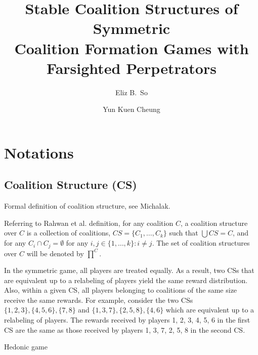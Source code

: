 \documentclass[sigconf,anonymous]{aamas}
\title[Stable Coalition Structures]{Stable Coalition Structures of Symmetric\\
Coalition Formation Games with Farsighted Perpetrators}
\author{Eliz B.~So}
\affiliation{
  \institution{Australian National University}
  \city{Canberra}
  \country{Australia }}
\author{Yun Kuen Cheung}
\affiliation{
  \institution{Australian National University}
  \city{Canberra}
  \country{Australia}}
\newcommand{\ykc}[1]{{\color{blue} #1}}
\begin{document}

\pagestyle{fancy}
\fancyhead{}


\maketitle 





\section{Notations}


\subsection{Coalition Structure (CS)}

\ykc{Formal definition of coalition structure, see Michalak.}

Referring to Rahwan et al. definition, for any coalition $C$, a coalition structure over $C$ is a collection of coalitions, $CS = \{ C_1, \dots, C_k\}$ such that $\bigcup CS = C$, and for any $C_i \cap C_j = \emptyset$ for any $i, j \in \{1, \dots, k\}:i\neq j$. The set of coalition structures over $C$ will be denoted by $\prod^C$.

In the symmetric game, all players are treated equally. As a result, two CSs that are equivalent up to a relabeling of players yield the same reward distribution. Also, within a given CS, all players belonging to coalitions of the same size receive the same rewards. For example, consider the two CSs $\{1, 2, 3\}, \{4, 5, 6\}, \{7, 8\}$ and $\{1, 3, 7\}, \{2, 5, 8\}, \{4, 6\}$ which are equivalent up to a relabeling of players. The rewards received by players 1, 2, 3, 4, 5, 6 in the first CS are the same as those received by players
1, 3, 7, 2, 5, 8 in the second CS.


\ykc{Hedonic game}
\end{document}

